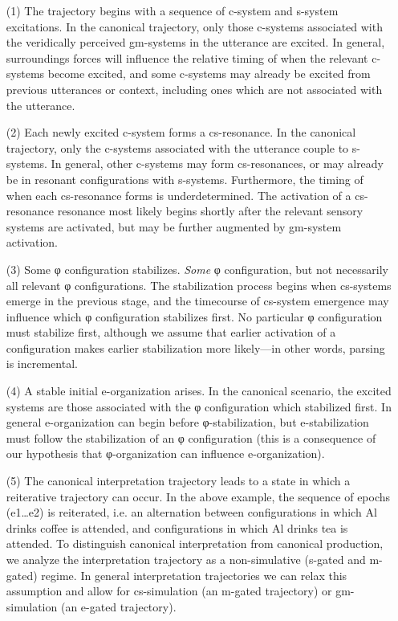 \begin{enumerate}
\item[(1)]
The trajectory begins with a sequence of c-system and s-system excitations. In the canonical trajectory, only those c-systems associated with the veridically perceived gm-systems in the utterance are excited. In general, surroundings forces will influence the relative timing of when the relevant c-systems become excited, and some c-systems may already be excited from previous utterances or context, including ones which are not associated with the utterance. 
\item[(2)]
Each newly excited c-system forms a cs-resonance. In the canonical trajectory, only the c-systems associated with the utterance couple to s-systems. In general, other c-systems may form cs-resonances, or may already be in resonant configurations with s-systems. Furthermore, the timing of when each cs-resonance forms is underdetermined. The activation of a cs-resonance resonance most likely begins shortly after the relevant sensory systems are activated, but may be further augmented by gm-system activation.
\item[(3)]
Some φ configuration stabilizes. \textit{Some} φ configuration, but not necessarily all relevant φ configurations. The stabilization process begins when cs-systems emerge in the previous stage, and the timecourse of cs-system emergence may influence which φ configuration stabilizes first. No particular φ configuration must stabilize first, although we assume that earlier activation of a configuration makes earlier stabilization more likely—in other words, parsing is incremental. 
\item[(4)]
A stable initial e-organization arises. In the canonical scenario, the excited systems are those associated with the φ configuration which stabilized first. In general e-organization can begin before φ-stabilization, but e-stabilization must follow the stabilization of an φ configuration (this is a consequence of our hypothesis that φ-organization can influence e-organization). 
\item[(5)]
The canonical interpretation trajectory leads to a state in which a reiterative trajectory can occur. In the above example, the sequence of epochs (e1…e2) is reiterated, i.e. an alternation between configurations in which {\textbar}Al drinks coffee{\textbar} is attended, and configurations in which {\textbar}Al drinks tea{\textbar} is attended. To distinguish canonical interpretation from canonical production, we analyze the interpretation trajectory as a non-simulative (s-gated and m-gated) regime. In general interpretation trajectories we can relax this assumption and allow for cs-simulation (an m-gated trajectory) or gm-simulation (an e-gated trajectory).
\end{enumerate}

